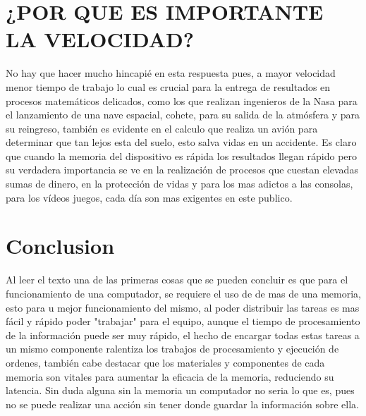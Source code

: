 \documentclass{article}
\begin{document}
{\section{¿POR QUE ES IMPORTANTE LA VELOCIDAD?}
No hay que hacer mucho hincapié en esta respuesta pues, a mayor velocidad menor tiempo de trabajo lo cual es crucial para la entrega de resultados en procesos matemáticos delicados, como los que realizan ingenieros de la Nasa para el lanzamiento de una nave espacial, cohete, para su salida de la atmósfera y para su reingreso, también es evidente en el calculo que realiza un avión para determinar que tan lejos esta del suelo, esto salva vidas en un accidente. Es claro que cuando la memoria del dispositivo es rápida los resultados llegan rápido pero su verdadera importancia se ve en la realización de procesos que cuestan elevadas sumas de dinero, en la protección de vidas y para los mas adictos a las consolas, para los vídeos juegos, cada día son mas exigentes en este publico. }
\newpage

\section{Conclusion}
Al leer el texto una de las primeras cosas que se pueden concluir es que para el funcionamiento de una computador, se requiere el uso de de mas de una memoria, esto para u mejor funcionamiento del mismo, al poder distribuir las tareas es mas fácil y rápido poder "trabajar" para el equipo, aunque el tiempo de procesamiento de la información puede ser muy rápido, el hecho de encargar todas estas tareas a un mismo componente ralentiza los trabajos de procesamiento y ejecución de ordenes, también cabe destacar que los materiales y componentes de cada memoria son vitales para aumentar la eficacia de la memoria, reduciendo su latencia. Sin duda alguna sin la memoria un computador no seria lo que es, pues no se puede realizar una acción sin tener donde guardar la información sobre ella.

\newpage


\end{document}
